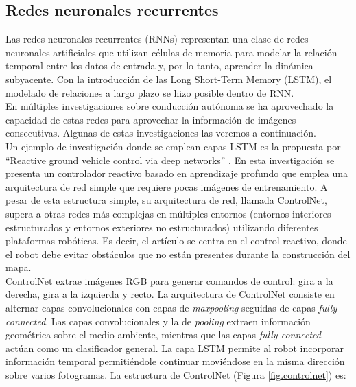 \subsection{Redes neuronales recurrentes}


Las redes neuronales recurrentes (RNNs) representan una clase de redes neuronales artificiales que utilizan células de memoria para modelar la relación temporal entre los datos de entrada y, por lo tanto, aprender la dinámica subyacente. Con la introducción de las Long Short-Term Memory (LSTM), el modelado de relaciones a largo plazo se hizo posible dentro de RNN.\\

En múltiples investigaciones sobre conducción autónoma se ha aprovechado la capacidad de estas redes para aprovechar la información de imágenes consecutivas. Algunas de estas investigaciones las veremos a continuación.\\

Un ejemplo de investigación donde se emplean capas LSTM es la propuesta por ``Reactive  ground  vehicle  control  via  deep networks'' \cite{reactive-ground}. En esta investigación se presenta un controlador reactivo basado en aprendizaje profundo que emplea una arquitectura de red simple que requiere pocas imágenes de entrenamiento. A pesar de esta estructura simple, su arquitectura de red, llamada ControlNet, supera a otras redes más complejas en múltiples entornos (entornos interiores estructurados y entornos exteriores no estructurados) utilizando diferentes plataformas robóticas. Es decir, el artículo se centra en el control reactivo, donde el robot debe evitar obstáculos que no están presentes durante la construcción del mapa.\\

ControlNet extrae imágenes RGB para generar comandos de control: gira a la derecha, gira a la izquierda y recto. La arquitectura de ControlNet consiste en alternar capas convolucionales con capas de \textit{maxpooling} seguidas de capas \textit{fully-connected}. Las capas convolucionales y la de \textit{pooling} extraen información geométrica sobre el medio ambiente, mientras que las capas \textit{fully-connected} actúan como un clasificador general. La capa LSTM permite al robot incorporar información temporal permitiéndole continuar moviéndose en la misma dirección sobre varios fotogramas. La estructura de ControlNet (Figura \ref{fig.controlnet}) es:

